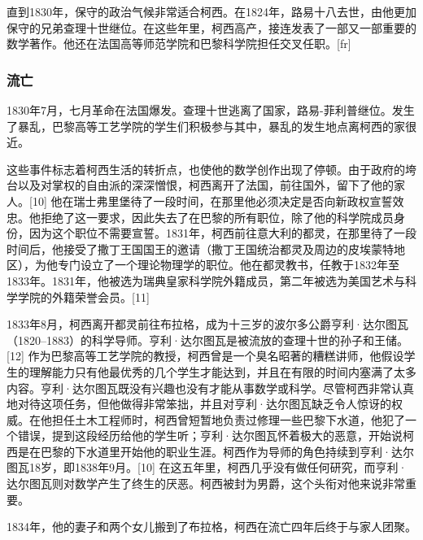 直到1830年，保守的政治气候非常适合柯西。在1824年，路易十八去世，由他更加保守的兄弟查理十世继位。在这些年里，柯西高产，接连发表了一部又一部重要的数学著作。他还在法国高等师范学院和巴黎科学院担任交叉任职。[fr]
\subsubsection{流亡}  
1830年7月，七月革命在法国爆发。查理十世逃离了国家，路易-菲利普继位。发生了暴乱，巴黎高等工艺学院的学生们积极参与其中，暴乱的发生地点离柯西的家很近。

这些事件标志着柯西生活的转折点，也使他的数学创作出现了停顿。由于政府的垮台以及对掌权的自由派的深深憎恨，柯西离开了法国，前往国外，留下了他的家人。[10] 他在瑞士弗里堡待了一段时间，在那里他必须决定是否向新政权宣誓效忠。他拒绝了这一要求，因此失去了在巴黎的所有职位，除了他的科学院成员身份，因为这个职位不需要宣誓。1831年，柯西前往意大利的都灵，在那里待了一段时间后，他接受了撒丁王国国王的邀请（撒丁王国统治都灵及周边的皮埃蒙特地区），为他专门设立了一个理论物理学的职位。他在都灵教书，任教于1832年至1833年。1831年，他被选为瑞典皇家科学院外籍成员，第二年被选为美国艺术与科学学院的外籍荣誉会员。[11]

1833年8月，柯西离开都灵前往布拉格，成为十三岁的波尔多公爵亨利·达尔图瓦（1820–1883）的科学导师。亨利·达尔图瓦是被流放的查理十世的孙子和王储。[12] 作为巴黎高等工艺学院的教授，柯西曾是一个臭名昭著的糟糕讲师，他假设学生的理解能力只有他最优秀的几个学生才能达到，并且在有限的时间内塞满了太多内容。亨利·达尔图瓦既没有兴趣也没有才能从事数学或科学。尽管柯西非常认真地对待这项任务，但他做得非常笨拙，并且对亨利·达尔图瓦缺乏令人惊讶的权威。在他担任土木工程师时，柯西曾短暂地负责过修理一些巴黎下水道，他犯了一个错误，提到这段经历给他的学生听；亨利·达尔图瓦怀着极大的恶意，开始说柯西是在巴黎的下水道里开始他的职业生涯。柯西作为导师的角色持续到亨利·达尔图瓦18岁，即1838年9月。[10] 在这五年里，柯西几乎没有做任何研究，而亨利·达尔图瓦则对数学产生了终生的厌恶。柯西被封为男爵，这个头衔对他来说非常重要。

1834年，他的妻子和两个女儿搬到了布拉格，柯西在流亡四年后终于与家人团聚。

